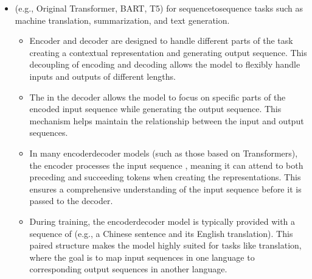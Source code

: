 \documentclass[letterpaper,11pt,english]{sphinxmanual}
\begin{document}
\begin{itemize}
\begin{itemize}
\item {} 
\sphinxAtStartPar
The self\sphinxhyphen{}attention mechanism in decoder\sphinxhyphen{}only models is ,
meaning each token attends only to previous tokens (including
itself). They are pretrained with , where they learn to predict the next token given the
previous ones.

\item {} 
\sphinxAtStartPar
Decoder\sphinxhyphen{}only models are not constrained to fixed\sphinxhyphen{}length outputs and
can generate sequences of arbitrary lengths, making them ideal for
open\sphinxhyphen{}ended tasks such as story writing, dialogue generation, and
summarization.

\end{itemize}

\item {} 
\sphinxAtStartPar
{} (e.g., Original Transformer, BART, T5) for
sequence\sphinxhyphen{}to\sphinxhyphen{}sequence tasks such as machine translation, summarization,
and text generation.
\begin{itemize}
\item {} 
\sphinxAtStartPar
Encoder and decoder are designed to handle different parts of the
task \sphinxhyphen{} creating a contextual representation and generating output
sequence. This decoupling of encoding and decoding allows the model
to flexibly handle inputs and outputs of different lengths.

\item {} 
\sphinxAtStartPar
The  in the decoder allows
the model to focus on specific parts of the encoded input sequence
while generating the output sequence. This 
mechanism helps maintain the relationship between the input and
output sequences.

\item {} 
\sphinxAtStartPar
In many encoder\sphinxhyphen{}decoder models (such as those based on
Transformers), the encoder processes the input sequence
, meaning it can attend to both preceding and
succeeding tokens when creating the representations. This ensures a
comprehensive understanding of the input sequence before it is
passed to the decoder.

\item {} 
\sphinxAtStartPar
During training, the encoder\sphinxhyphen{}decoder model is typically provided
with a sequence of  (e.g., a Chinese sentence
and its English translation). This paired structure makes the model
highly suited for tasks like translation, where the goal is to map
input sequences in one language to corresponding output sequences in
another language.

\end{itemize}

\end{itemize}
\end{document}
